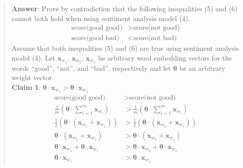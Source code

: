 \begin{quote}
    {\bf Answer}: Prove by contradiction that the following inequalities (5) and (6) cannot both hold when using sentiment analysis model (4).
    \begin{align}
	\textrm{score(good good)} &> \textrm{score(not good)} \\
	\textrm{score(good bad)} &< \textrm{score(not bad)}
    \end{align}
    Assume that both inequalities (5) and (6) are true using sentiment analysis model (4). Let $\textbf{x}_{w_1}$, $\textbf{x}_{w_2}$, $\textbf{x}_{w_3}$ be arbitrary word embedding vectors for the words ``good'', ``not'', and ``bad'', respectively and let $\mathbf{\theta}$ be an arbitrary weight vector. \\ 

    {\bf Claim 1}: $\mathbf{\theta} \cdot \textbf{x}_{w_1} > \mathbf{\theta} \cdot \textbf{x}_{w_2}$
    \begin{align*}
	\textrm{score(good good)} &> \textrm{score(not good)} \\
	\frac{1}{m} \left( \mathbf{\theta} \cdot \sum_{i=1}^m \textbf{x}_{w_i} \right) &> \frac{1}{m} \left( \mathbf{\theta} \cdot \sum_{i=1}^m \textbf{x}_{w_i} \right) \\
	\frac{1}{2} \left( \mathbf{\theta} \cdot \left( \textbf{x}_{w_1} + \textbf{x}_{w_1} \right) \right) &> \frac{1}{2} \left( \mathbf{\theta} \cdot \left( \textbf{x}_{w_2} + \textbf{x}_{w_1} \right) \right) \\
    \mathbf{\theta} \cdot \left( \textbf{x}_{w_1} + \textbf{x}_{w_1} \right) &> \mathbf{\theta} \cdot \left( \textbf{x}_{w_2} + \textbf{x}_{w_1} \right) \\
	\mathbf{\theta} \cdot \textbf{x}_{w_1} + \mathbf{\theta} \cdot \textbf{x}_{w_1}  &> \mathbf{\theta} \cdot \textbf{x}_{w_2} + \mathbf{\theta} \cdot \textbf{x}_{w_1} \\
	\mathbf{\theta} \cdot \textbf{x}_{w_1} &> \mathbf{\theta} \cdot \textbf{x}_{w_2}
    \end{align*}


\end{quote}
